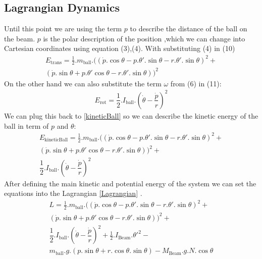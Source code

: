 \subsection{Lagrangian Dynamics}
Until this point we are using the term $p$ to describe the distance of the ball on the beam.
$p$ is the polar description of the position ,which we can change into Cartesian coordinates using equation (3),(4).
With substituting (4) in (10)
\begin{equation}\label{velocity}
	\begin{split}
		E_{\text{trans}} = \frac{1}{2}.m_{\text{ball}}.((\dot{p}.\cos{\theta}-p.\theta'.\sin{\theta} - r.\theta'.\sin{\theta})^2 + \\
		(\dot{p}.\sin{\theta}+ p.\theta'\cos{\theta} - r.\theta'.\sin{\theta}) )^2
	\end{split}
\end{equation}
On the other hand we can also substitute the term $\omega$ from (6) in (11):
\begin{equation}
	\begin{split}
		E_{\text{rot}} = \dfrac{1}{2}.I_{\text{ball}}.(\dot{\theta} - \dfrac{\dot{p}}{r})^2
	\end{split}
\end{equation}
We can plug this back to \ref{kineticBall} so we can describe the kinetic energy of the ball in term of $p$ and $\theta$:
\begin{equation}
	\begin{aligned}
		E_{\text{kineticBall}} = \frac{1}{2}.m_{\text{ball}}.((\dot{p}.\cos{\theta}-p.\theta'.\sin{\theta} - r.\theta'.\sin{\theta})^2 + \\
		(\dot{p}.\sin{\theta}+ p.\theta'\cos{\theta} - r.\theta'.\sin{\theta}) )^2 + \\
		\dfrac{1}{2}.I_{\text{ball}}.(\dot{\theta} - \dfrac{\dot{p}}{r})^2
	\end{aligned}
\end{equation}
After defining the main kinetic and potential energy of the system we can set the 
equations into the Lagrangian \ref{Lagrangian} .
\begin{multline}
		L =  \frac{1}{2}.m_{\text{ball}}.((\dot{p}.\cos{\theta}-p.\theta'.\sin{\theta} - r.\theta'.\sin{\theta})^2 + \\
		(\dot{p}.\sin{\theta}+ p.\theta'\cos{\theta} - r.\theta'.\sin{\theta}) )^2 + \\
		\dfrac{1}{2}.I_{\text{ball}}.(\dot{\theta} - \dfrac{\dot{p}}{r})^2 + \frac{1}{2}.I_{\text{Beam}}.\theta'^2 - \\
		m_{\text{ball}}.g.(p.\sin{\theta} + r.\cos{\theta}.\sin{\theta})-M_{\text{Beam}}.g.N.\cos{\theta}
\end{multline}
